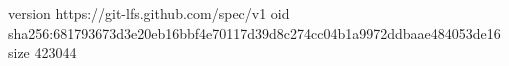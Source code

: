version https://git-lfs.github.com/spec/v1
oid sha256:681793673d3e20eb16bbf4e70117d39d8c274cc04b1a9972ddbaae484053de16
size 423044
